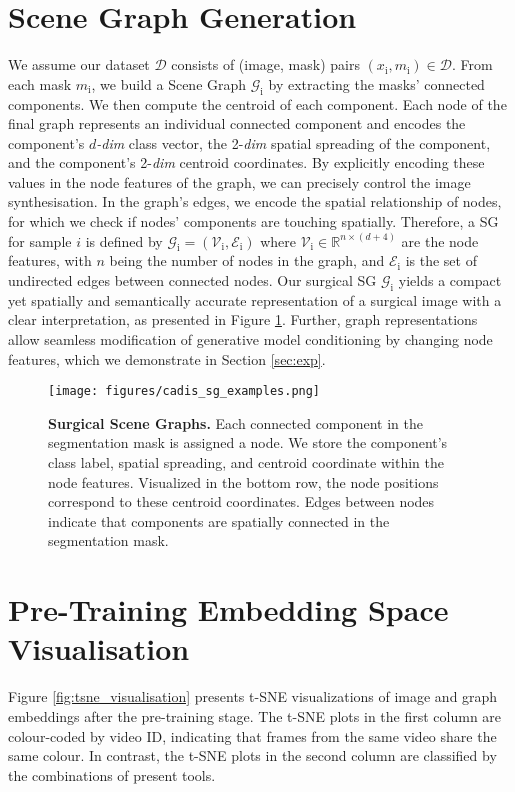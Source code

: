 \section{Scene Graph Generation}
\label{sec:app_sg}

We assume our dataset $\mathcal{D}$ consists of (image, mask) pairs $(x_\text{i},m_\text{i}) \in \mathcal{D}$. From each mask $m_\text{i}$, we build a Scene Graph $\mathcal{G}_\text{i}$ by extracting the masks’ connected components. We then compute the centroid of each component. Each node of the final graph represents an individual connected component and encodes the component’s \textit{$d$-dim} class vector, the 2-\textit{dim} spatial spreading of the component, and the component’s 2-\textit{dim} centroid coordinates. By explicitly encoding these values in the node features of the graph, we can precisely control the image synthesisation. In the graph’s edges, we encode the spatial relationship of nodes, for which we check if nodes’ components are touching spatially. Therefore, a SG for sample $i$ is defined by $\mathcal{G}_\text{i} = (\mathcal{V}_\text{i},\mathcal{E}_\text{i})$ where $\mathcal{V}_\text{i} \in \mathbb{R}^{n\times(d + 4)}$ are the node features, with $n$ being the number of nodes in the graph, and $\mathcal{E}_\text{i}$  is the set of undirected edges between connected nodes. Our surgical SG $\mathcal{G}_\text{i}$ yields a compact yet spatially and semantically accurate representation of a surgical image with a clear interpretation, as presented in Figure \ref{fig:sg}. Further, graph representations allow seamless modification of generative model conditioning by changing node features, which we demonstrate in Section \ref{sec:exp}. 

\begin{figure}[htbp]
    \centering
    \texttt{[image: figures/cadis\_sg\_examples.png]}
    \caption{\textbf{Surgical Scene Graphs.} Each connected component in the segmentation mask is assigned a node. We store the component's class label, spatial spreading, and centroid coordinate within the node features. Visualized in the bottom row, the node positions correspond to these centroid coordinates. Edges between nodes indicate that components are spatially connected in the segmentation mask.}
    \label{fig:sg}
\end{figure}

\section{Pre-Training Embedding Space Visualisation}
\label{sec:app_tsne}
Figure \ref{fig:tsne_visualisation} presents t-SNE visualizations of image and graph embeddings after the pre-training stage. The t-SNE plots in the first column are colour-coded by video ID, indicating that frames from the same video share the same colour. In contrast, the t-SNE plots in the second column are classified by the combinations of present tools.

